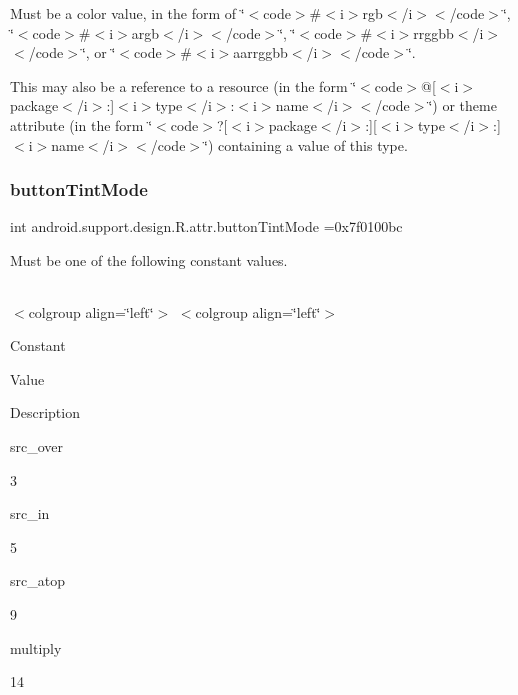 Must be a color value, in the form of \char`\"{}$<$code$>$\#$<$i$>$rgb$<$/i$>$$<$/code$>$\char`\"{}, \char`\"{}$<$code$>$\#$<$i$>$argb$<$/i$>$$<$/code$>$\char`\"{}, \char`\"{}$<$code$>$\#$<$i$>$rrggbb$<$/i$>$$<$/code$>$\char`\"{}, or \char`\"{}$<$code$>$\#$<$i$>$aarrggbb$<$/i$>$$<$/code$>$\char`\"{}. 

This may also be a reference to a resource (in the form \char`\"{}$<$code$>$@\mbox{[}$<$i$>$package$<$/i$>$\+:\mbox{]}$<$i$>$type$<$/i$>$\+:$<$i$>$name$<$/i$>$$<$/code$>$\char`\"{}) or theme attribute (in the form \char`\"{}$<$code$>$?\mbox{[}$<$i$>$package$<$/i$>$\+:\mbox{]}\mbox{[}$<$i$>$type$<$/i$>$\+:\mbox{]}$<$i$>$name$<$/i$>$$<$/code$>$\char`\"{}) containing a value of this type. \mbox{\label{classandroid_1_1support_1_1design_1_1R_1_1attr_a8f45cc6e039e1e19c4c368e82b8e4939}} 
\subsubsection{\texorpdfstring{button\+Tint\+Mode}{buttonTintMode}}
{\footnotesize\ttfamily int android.\+support.\+design.\+R.\+attr.\+button\+Tint\+Mode =0x7f0100bc\hspace{0.3cm}{\ttfamily [static]}}

Must be one of the following constant values.

\tabulinesep=1mm
\begin{longtabu} spread 0pt [c]{*{0}{|X[-1]}|}
\hline
\end{longtabu}
$<$colgroup align=\char`\"{}left\char`\"{}$>$ $<$colgroup align=\char`\"{}left\char`\"{}$>$ 

Constant

Value

Description 

{\ttfamily src\+\_\+over}

3

{\ttfamily src\+\_\+in}

5

{\ttfamily src\+\_\+atop}

9

{\ttfamily multiply}

14

